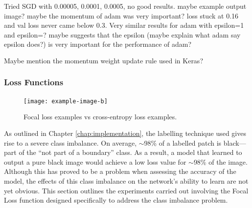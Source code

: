 Tried SGD with 0.00005, 0.0001, 0.0005, no good results. maybe example output image? maybe the momentum of adam was very important? loss stuck at 0.16 and val loss never came below 0.3. Very similar results for adam with epsilon=1 and epsilon=? maybe suggests that the epsilon (maybe explain what adam say epsilon does?) is very important for the performance of adam?

Maybe mention the momentum weight update rule used in Keras?

\subsubsection{Loss Functions}

\begin{figure}[!t]
    \texttt{[image: example-image-b]}
    \caption{Focal loss examples vs cross-entropy loss examples.}
    \label{fig:lossfunctiondiff}
\end{figure}

As outlined in Chapter \ref{chap:implementation}, the labelling technique used gives rise to a severe class imbalance. On average, ${\sim}$98\% of a labelled patch is black---part of the ``not part of a boundary'' class. As a result, a model that learned to output a pure black image would achieve a low loss value for ${\sim}$98\% of the image. Although this has proved to be a problem when assessing the accuracy of the model, the effects of this class imbalance on the network's ability to learn are not yet obvious. This section outlines the experiments carried out involving the Focal Loss function designed specifically to address the class imbalance problem.



